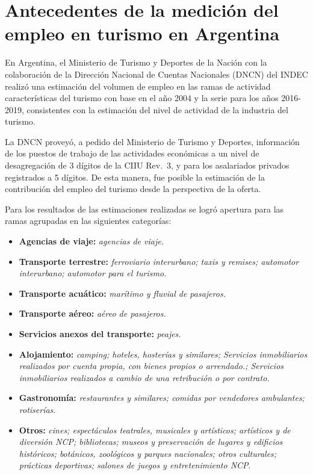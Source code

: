\documentclass[
  openany]{book}
\providecommand{\tightlist}{%
  \setlength{\itemsep}{0pt}\setlength{\parskip}{0pt}}
\begin{document}
\hypertarget{antecedentes-de-la-mediciuxf3n-del-empleo-en-turismo-en-argentina}{%
\section{Antecedentes de la medición del empleo en turismo en Argentina}\label{antecedentes-de-la-mediciuxf3n-del-empleo-en-turismo-en-argentina}}

En Argentina, el Ministerio de Turismo y Deportes de la Nación con la colaboración de la Dirección Nacional de Cuentas Nacionales (DNCN) del INDEC realizó una estimación del volumen de empleo en las ramas de actividad características del turismo con base en el año 2004 y la serie para los años 2016-2019, consistentes con la estimación del nivel de actividad de la industria del turismo.

La DNCN proveyó, a pedido del Ministerio de Turismo y Deportes, información de los puestos de trabajo de las actividades económicas a un nivel de desagregación de 3 dígitos de la CIIU Rev.~3, y para los asalariados privados registrados a 5 dígitos. De esta manera, fue posible la estimación de la contribución del empleo del turismo desde la perspectiva de la oferta.

Para los resultados de las estimaciones realizadas se logró apertura para las ramas agrupadas en las siguientes categorías:

\begin{itemize}
\tightlist
\item
  \textbf{Agencias de viaje:} \emph{agencias de viaje.}
\item
  \textbf{Transporte terrestre:} \emph{ferroviario interurbano; taxis y remises; automotor interurbano; automotor para el turismo.}
\item
  \textbf{Transporte acuático:} \emph{marítimo y fluvial de pasajeros.}
\item
  \textbf{Transporte aéreo:} \emph{aéreo de pasajeros.}
\item
  \textbf{Servicios anexos del transporte:} \emph{peajes.}
\item
  \textbf{Alojamiento:} \emph{camping; hoteles, hosterías y similares; Servicios inmobiliarios realizados por cuenta propia, con bienes propios o arrendado.; Servicios inmobiliarios realizados a cambio de una retribución o por contrato.}
\item
  \textbf{Gastronomía:} \emph{restaurantes y similares; comidas por vendedores ambulantes; rotiserías.}
\item
  \textbf{Otros:} \emph{cines; espectáculos teatrales, musicales y artísticos; artísticos y de diversión NCP; bibliotecas; museos y preservación de lugares y edificios históricos; botánicos, zoológicos y parques nacionales; otros culturales; prácticas deportivas; salones de juegos y entretenimiento NCP}.
\end{itemize}
\end{document}
